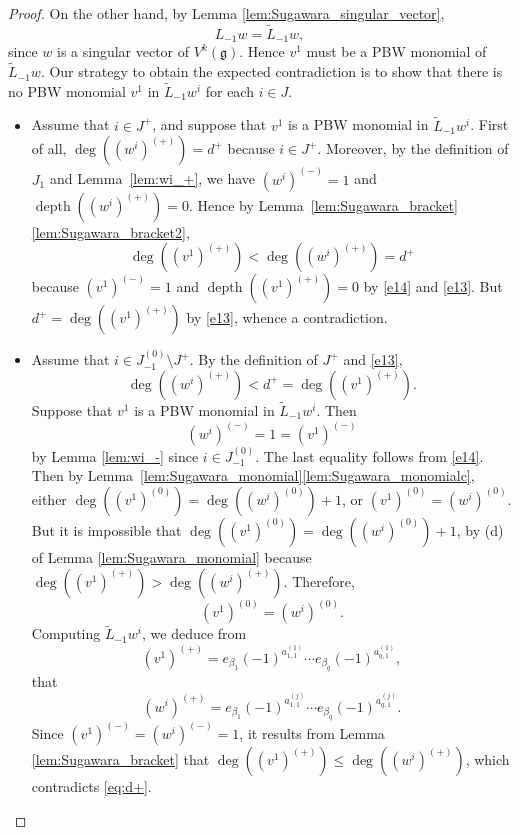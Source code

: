 \documentclass[11pt]{article}
\numberwithin{equation}{section}
\let\be\beta
\DeclareMathOperator{\dep}{depth}
\newcommand \g{\mathfrak g}
\theoremstyle{definition}
\begin{document}
\begin{proof}
On the other hand, by Lemma \ref{lem:Sugawara_singular_vector},
\begin{equation*}
L_{-1} w={\tilde{L}_{-1} w},
\end{equation*}
since $w$ is a singular vector of $V^k(\g)$.
Hence $v^1$ must be a PBW monomial of {$\tilde{L}_{-1} w$}.
Our strategy to obtain the expected contradiction
is to show that there is no PBW monomial $v^1$ in {$\tilde{L}_{-1} w^i$}
for each $i \in J$.

\begin{itemize}
\item
Assume that $i\in J^+$, and suppose that
$v^{1}$ is a PBW monomial in ${\tilde{L}_{-1} w^{i}}$.
First of all, $\deg((w^{i})^{(+)}) = d^+$
because $i \in J^+$. Moreover,
by the definition of $J_1$ and Lemma~\ref{lem:wi_+},
we have $(w^{i})^{(-)}=1$ and $\dep((w^{i})^{(+)})=0$.
Hence by Lemma~\ref{lem:Sugawara_bracket}\eqref{lem:Sugawara_bracket2},
\[
\deg((v^1)^{(+)}) < \deg((w^{i})^{(+)}) = d^+
\]
because $(v^1)^{(-)}=1$ and $\dep((v^{1})^{(+)})=0$ by \eqref{e14}
and \eqref{e13}.
But $d^+ = \deg((v^1)^{(+)})$ by \eqref{e13},
whence a contradiction.

\item
Assume that $i \in J_{-1}^{(0)} \setminus J^+$.
By the definition of $J^+$ and \eqref{e13},
\begin{equation}
\label{eq:d+}
\deg ((w^{i})^{(+)}) < d^+ =\deg((v^1)^{(+)}).
\end{equation}
Suppose that
$v^{1}$ is a PBW monomial in ${\tilde{L}_{-1} w^{i}}$.
Then
\begin{equation}
\label{e15}
(w^{i})^{(-)}=1 = (v^1)^{(-)}
\end{equation}
by Lemma \ref{lem:wi_-} since $i \in J_{-1}^{(0)}$.
The last equality follows from \eqref{e14}.
Then by Lemma~\ref{lem:Sugawara_monomial}\eqref{lem:Sugawara_monomialc},
either $\deg((v^1)^{(0)})=\deg((w^{i})^{(0)})+1$,
or $(v^1)^{(0)}=(w^{i})^{(0)}.$
But it is impossible that $\deg((v^1)^{(0)})=\deg((w^{i})^{(0)})+1$,
by (d) of Lemma \ref{lem:Sugawara_monomial} because $\deg((v^1)^{(+)}) > \deg ((w^{i})^{(+)})$.
Therefore,
\[
(v^1)^{(0)}=(w^{i})^{(0)}.
\]
Computing $\tilde{L}_{-1} w^{i}$, we deduce from
\[
(v^1)^{(+)}=e_{\be_1}(-1)^{a^{(1)}_{1,1}}\cdots e_{\be_{q}}(-1)^{a^{(1)}_{q,1}},
\]
that
\[
(w^i)^{(+)}=e_{\be_1}(-1)^{a^{(j)}_{1,1}}\cdots e_{\be_{q}}(-1)^{a^{(j)}_{q,1}}.
\]
Since $(v^1)^{(-)}\!=\!(w^{i})^{(-)}\!=\!1$, it
results from Lemma \ref{lem:Sugawara_bracket}
that \hbox{$\deg((v^1)^{(+)})\!\leq\!\deg((w^{i})^{(+)})$},
which contradicts \eqref{eq:d+}.


\end{itemize}
\end{proof}
\end{document}
